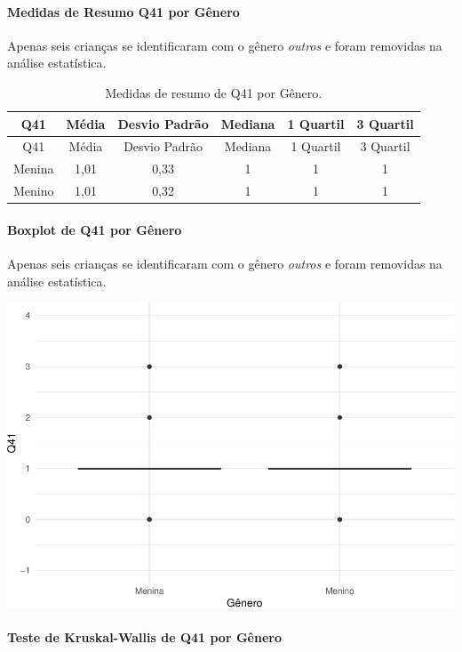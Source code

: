 \documentclass[]{article}
\let\oldparagraph\paragraph
\renewcommand{\paragraph}[1]{\oldparagraph{#1}\mbox{}}
\begin{document}
\hypertarget{medidas-de-resumo-q41-por-guxeanero}{%
\paragraph{Medidas de Resumo Q41 por Gênero}\label{medidas-de-resumo-q41-por-guxeanero}}

Apenas seis crianças se identificaram com o gênero \emph{outros} e foram removidas na análise estatística.

\begin{longtable}[]{@{}cccccc@{}}
\caption{\label{tab:unnamed-chunk-1619}Medidas de resumo de Q41 por Gênero.}\tabularnewline
\toprule
Q41 & Média & Desvio Padrão & Mediana & 1 Quartil & 3 Quartil\tabularnewline
\midrule
\endfirsthead
\toprule
Q41 & Média & Desvio Padrão & Mediana & 1 Quartil & 3 Quartil\tabularnewline
\midrule
\endhead
Menina & 1,01 & 0,33 & 1 & 1 & 1\tabularnewline
Menino & 1,01 & 0,32 & 1 & 1 & 1\tabularnewline
\bottomrule
\end{longtable}

\hypertarget{boxplot-de-q41-por-guxeanero}{%
\paragraph{Boxplot de Q41 por Gênero}\label{boxplot-de-q41-por-guxeanero}}

Apenas seis crianças se identificaram com o gênero \emph{outros} e foram removidas na análise estatística.

\begin{center}\includegraphics[width=0.75\linewidth]{relatorio_covid19_files/figure-latex/unnamed-chunk-1620-1} \end{center}

\hypertarget{teste-de-kruskal-wallis-de-q41-por-guxeanero}{%
\paragraph{Teste de Kruskal-Wallis de Q41 por Gênero}\label{teste-de-kruskal-wallis-de-q41-por-guxeanero}}
\end{document}
